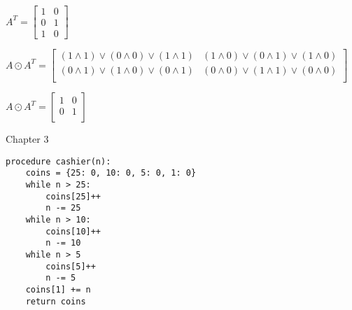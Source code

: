 \documentclass{exam}
\begin{document}
\begin{questions}
\begin{center}
\( A^T =
\begin{bmatrix}
1 & 0\\
0 & 1\\
1 & 0
\end{bmatrix}
\)

\( A \odot A^T =
\begin{bmatrix}
(1 \land 1) \lor (0 \land 0) \lor (1 \land 1) & (1 \land 0) \lor (0 \land 1) \lor (1 \land 0)\\
(0 \land 1) \lor (1 \land 0) \lor (0 \land 1) & (0 \land 0) \lor (1 \land 1) \lor (0 \land 0)\\
\end{bmatrix}
\)

\( A \odot A^T =
\begin{bmatrix}
1 & 0\\
0 & 1\\
\end{bmatrix}
\)

\end{center}





\vspace{10pt}
{\Large Chapter 3}
\vspace{2pt}


\begin{center}

\begin{verbatim}
procedure cashier(n):
    coins = {25: 0, 10: 0, 5: 0, 1: 0}
    while n > 25:
        coins[25]++
        n -= 25
    while n > 10:
        coins[10]++
        n -= 10
    while n > 5
        coins[5]++
        n -= 5
    coins[1] += n
    return coins
\end{verbatim}


\end{center}
\end{questions}
\end{document}
